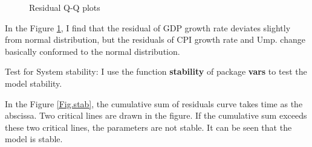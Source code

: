 \documentclass{report}
\begin{document}
\begin{figure}[H]
\centering  %
\caption{Residual Q-Q plots}
\label{fig.qq}
\end{figure}

In the Figure \ref{fig.qq}, I find that the residual of GDP growth rate deviates slightly from normal distribution, but the residuals of CPI growth rate and Ump. change basically conformed to the normal distribution.

Test for System stability:  I use the function \textbf{stability} of package \textbf{vars} to test the model stability.

In the Figure \ref{Fig.stab}, the cumulative sum of residuals curve takes time as the abscissa. Two critical lines are drawn in the figure. If the cumulative sum exceeds these two critical lines, the parameters are not stable. It can be seen that the model is stable.
\end{document}
